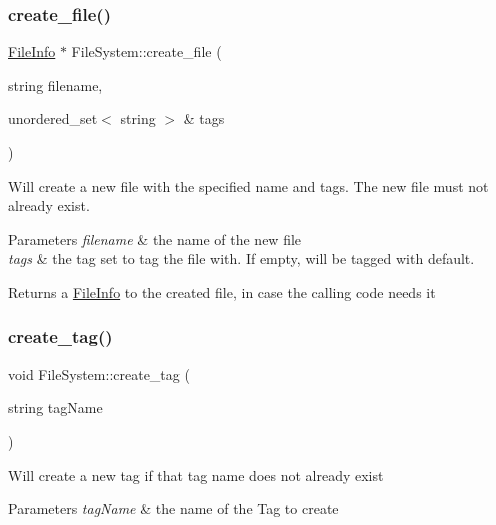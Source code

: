 \subsubsection{\texorpdfstring{create\+\_\+file()}{create\_file()}}
{\footnotesize\ttfamily \mbox{\hyperlink{classFileInfo}{File\+Info}} $\ast$ File\+System\+::create\+\_\+file (\begin{DoxyParamCaption}\item[{string}]{filename,  }\item[{unordered\+\_\+set$<$ string $>$ \&}]{tags }\end{DoxyParamCaption})}

Will create a new file with the specified name and tags. The new file must not already exist. 
\begin{DoxyParams}{Parameters}
{\em filename} & the name of the new file \\
\hline
{\em tags} & the tag set to tag the file with. If empty, will be tagged with default. \\
\hline
\end{DoxyParams}
\begin{DoxyReturn}{Returns}
a \mbox{\hyperlink{classFileInfo}{File\+Info}} to the created file, in case the calling code needs it 
\end{DoxyReturn}
\mbox{\label{classFileSystem_a678d743f3dc5b86c0b0c568795ec6a29}} 
\subsubsection{\texorpdfstring{create\+\_\+tag()}{create\_tag()}}
{\footnotesize\ttfamily void File\+System\+::create\+\_\+tag (\begin{DoxyParamCaption}\item[{string}]{tag\+Name }\end{DoxyParamCaption})}

Will create a new tag if that tag name does not already exist 
\begin{DoxyParams}{Parameters}
{\em tag\+Name} & the name of the Tag to create \\
\hline
\end{DoxyParams}
\mbox{\label{classFileSystem_a2718456ead4a9e7244c33d4a86cb844c}} 
